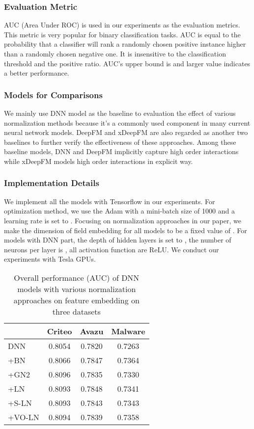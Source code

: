 \documentclass[sigconf]{acmart}
\begin{document}
\subsubsection{Evaluation Metric} 	AUC (Area Under ROC) is used in our experiments as the evaluation metrics. This metric is very popular for binary classification tasks. AUC is equal to the probability that a classifier will rank a randomly chosen positive instance higher than a randomly chosen negative one.  It is insensitive to the classification threshold and the positive ratio. AUC's upper bound is  and larger value indicates a better performance.

\subsubsection{Models for Comparisons}	We mainly use DNN model as the baseline to evaluation the effect of various normalization methods because it's a commonly used component in many current neural network models. DeepFM and xDeepFM are also regarded as another two baselines to further verify the effectiveness of these approaches. Among these baseline models, DNN and DeepFM implicitly capture high order interactions while xDeepFM models high order interactions in explicit way.

\subsubsection{Implementation Details}	We implement all the models with Tensorflow in our experiments. For optimization method, we use the Adam with a mini-batch size of 1000 and a learning rate is set to .  Focusing on normalization approaches in our paper, we make the dimension of field embedding for all models to be a fixed value of . For models with DNN part, the depth of hidden layers is set to , the number of neurons per layer is , all activation function are ReLU. We conduct our experiments with  Tesla  GPUs.






\begin{table}
  \caption{Overall performance (AUC) of DNN models with various normalization approaches on feature embedding on three datasets}
  \begin{tabular}{l|ccc}
    \toprule
    & Criteo & Avazu & Malware \\
    \midrule
       DNN &
    0.8054 &
    0.7820 &
    0.7263 \\
    \midrule
       +BN &
    0.8066 &
    0.7847 &
    0.7364 \\
       +GN2 &
    0.8096 &
    0.7835 &
    0.7330 \\
       +LN &
    0.8093 &
    0.7848 &
    0.7341 \\
       +S-LN &
    0.8093 &
    0.7843 &
    0.7343 \\
       +VO-LN &
    0.8094 &
    0.7839 &
    0.7358 \\
    \bottomrule
  \end{tabular}
  \label{tab:varnorm_emb_auc}
\end{table}
\end{document}
